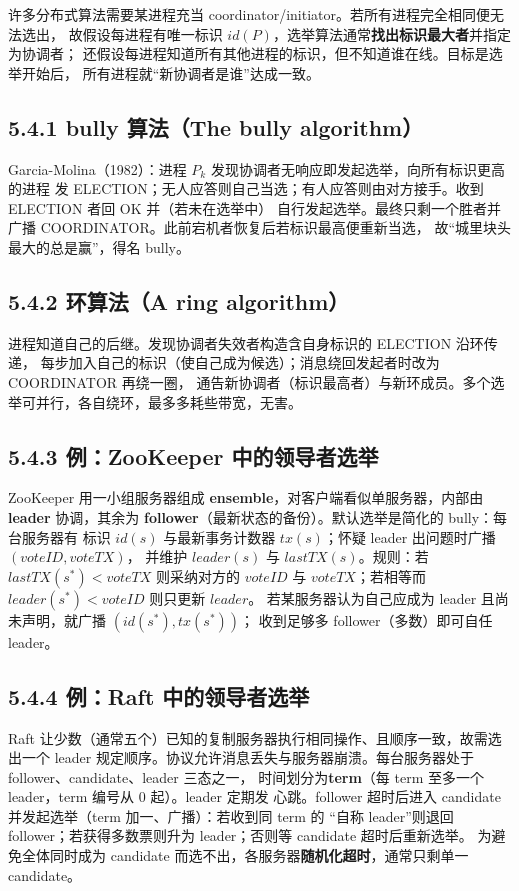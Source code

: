 

许多分布式算法需要某进程充当 coordinator/initiator。若所有进程完全相同便无法选出，
故假设每进程有唯一标识 $id(P)$，选举算法通常\textbf{找出标识最大者}并指定为协调者；
还假设每进程知道所有其他进程的标识，但不知道谁在线。目标是选举开始后，
所有进程就“新协调者是谁”达成一致。

\subsection*{5.4.1 bully 算法（The bully algorithm）}
Garcia-Molina（1982）：进程 $P_k$ 发现协调者无响应即发起选举，向所有标识更高的进程
发 ELECTION；无人应答则自己当选；有人应答则由对方接手。收到 ELECTION 者回 OK 并（若未在选举中）
自行发起选举。最终只剩一个胜者并广播 COORDINATOR。此前宕机者恢复后若标识最高便重新当选，
故“城里块头最大的总是赢”，得名 bully。

\subsection*{5.4.2 环算法（A ring algorithm）}
进程知道自己的后继。发现协调者失效者构造含自身标识的 ELECTION 沿环传递，
每步加入自己的标识（使自己成为候选）；消息绕回发起者时改为 COORDINATOR 再绕一圈，
通告新协调者（标识最高者）与新环成员。多个选举可并行，各自绕环，最多多耗些带宽，无害。

\subsection*{5.4.3 例：ZooKeeper 中的领导者选举}
ZooKeeper 用一小组服务器组成 \textbf{ensemble}，对客户端看似单服务器，内部由 \textbf{leader}
协调，其余为 \textbf{follower}（最新状态的备份）。默认选举是简化的 bully：每台服务器有
标识 $id(s)$ 与最新事务计数器 $tx(s)$；怀疑 leader 出问题时广播 $(voteID, voteTX)$，
并维护 $leader(s)$ 与 $lastTX(s)$。规则：若 $lastTX(s^*) < voteTX$ 则采纳对方的
$voteID$ 与 $voteTX$；若相等而 $leader(s^*) < voteID$ 则只更新 $leader$。
若某服务器认为自己应成为 leader 且尚未声明，就广播 $(id(s^*), tx(s^*))$；
收到足够多 follower（多数）即可自任 leader。

\subsection*{5.4.4 例：Raft 中的领导者选举}
Raft 让少数（通常五个）已知的复制服务器执行相同操作、且顺序一致，故需选出一个 leader
规定顺序。协议允许消息丢失与服务器崩溃。每台服务器处于 follower、candidate、leader 三态之一，
时间划分为\textbf{term}（每 term 至多一个 leader，term 编号从 0 起）。leader 定期发
心跳。follower 超时后进入 candidate 并发起选举（term 加一、广播）：若收到同 term 的
“自称 leader”则退回 follower；若获得多数票则升为 leader；否则等 candidate 超时后重新选举。
为避免全体同时成为 candidate 而选不出，各服务器\textbf{随机化超时}，通常只剩单一 candidate。


